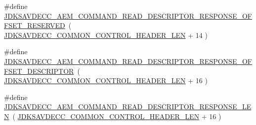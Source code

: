 \begin{DoxyCompactItemize}
\item 
\#define \hyperlink{group__command__read__descriptor__response_ga2883c4bf54c898985001e63a85ce8dc6}{J\+D\+K\+S\+A\+V\+D\+E\+C\+C\+\_\+\+A\+E\+M\+\_\+\+C\+O\+M\+M\+A\+N\+D\+\_\+\+R\+E\+A\+D\+\_\+\+D\+E\+S\+C\+R\+I\+P\+T\+O\+R\+\_\+\+R\+E\+S\+P\+O\+N\+S\+E\+\_\+\+O\+F\+F\+S\+E\+T\+\_\+\+R\+E\+S\+E\+R\+V\+ED}~( \hyperlink{group__jdksavdecc__avtp__common__control__header_gaae84052886fb1bb42f3bc5f85b741dff}{J\+D\+K\+S\+A\+V\+D\+E\+C\+C\+\_\+\+C\+O\+M\+M\+O\+N\+\_\+\+C\+O\+N\+T\+R\+O\+L\+\_\+\+H\+E\+A\+D\+E\+R\+\_\+\+L\+EN} + 14 )
\item 
\#define \hyperlink{group__command__read__descriptor__response_gafbdbe4e6fbe486f0e98450bd1bcecafc}{J\+D\+K\+S\+A\+V\+D\+E\+C\+C\+\_\+\+A\+E\+M\+\_\+\+C\+O\+M\+M\+A\+N\+D\+\_\+\+R\+E\+A\+D\+\_\+\+D\+E\+S\+C\+R\+I\+P\+T\+O\+R\+\_\+\+R\+E\+S\+P\+O\+N\+S\+E\+\_\+\+O\+F\+F\+S\+E\+T\+\_\+\+D\+E\+S\+C\+R\+I\+P\+T\+OR}~( \hyperlink{group__jdksavdecc__avtp__common__control__header_gaae84052886fb1bb42f3bc5f85b741dff}{J\+D\+K\+S\+A\+V\+D\+E\+C\+C\+\_\+\+C\+O\+M\+M\+O\+N\+\_\+\+C\+O\+N\+T\+R\+O\+L\+\_\+\+H\+E\+A\+D\+E\+R\+\_\+\+L\+EN} + 16 )
\item 
\#define \hyperlink{group__command__read__descriptor__response_ga66447b2275458270651649e1df225406}{J\+D\+K\+S\+A\+V\+D\+E\+C\+C\+\_\+\+A\+E\+M\+\_\+\+C\+O\+M\+M\+A\+N\+D\+\_\+\+R\+E\+A\+D\+\_\+\+D\+E\+S\+C\+R\+I\+P\+T\+O\+R\+\_\+\+R\+E\+S\+P\+O\+N\+S\+E\+\_\+\+L\+EN}~( \hyperlink{group__jdksavdecc__avtp__common__control__header_gaae84052886fb1bb42f3bc5f85b741dff}{J\+D\+K\+S\+A\+V\+D\+E\+C\+C\+\_\+\+C\+O\+M\+M\+O\+N\+\_\+\+C\+O\+N\+T\+R\+O\+L\+\_\+\+H\+E\+A\+D\+E\+R\+\_\+\+L\+EN} + 16 )
\end{DoxyCompactItemize}
